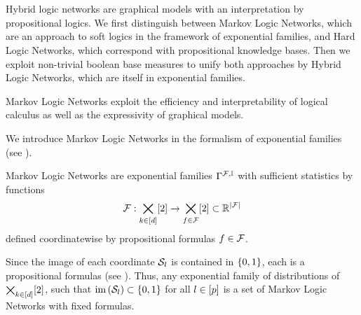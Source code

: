 \chapter{\chatextnetworkRepresentation}\label{cha:networkRepresentation}

Hybrid logic networks are graphical models with an interpretation by propositional logics.
We first distinguish between Markov Logic Networks, which are an approach to soft logics in the framework of exponential families, and Hard Logic Networks, which correspond with propositional knowledge bases.
Then we exploit non-trivial boolean base measures to unify both approaches by Hybrid Logic Networks, which are itself in exponential families.




Markov Logic Networks exploit the efficiency and interpretability of logical calculus as well as the expressivity of graphical models.


We introduce Markov Logic Networks in the formalism of exponential families (see ).

\begin{definition}
    Markov Logic Networks are exponential families $\Gamma^{\mathcal{F},\mathbb{I}}$ with sufficient statistics by functions
    \[ \mathcal{F} : \bigtimes_{k\in[d]}[2] \rightarrow \bigtimes_{f\in\mathcal{F}}[2] \subset \mathbb{R}^{\left|\mathcal{F}\right|} \]
    defined coordinatewise by propositional formulas $f\in\mathcal{F}$.
\end{definition}

Since the image of each coordinate $\mathcal{S}_{l}$ is contained in $\{0,1\}$, each is a propositional formulas (see ).
Thus, any exponential family of distributions of $\bigtimes_{k\in[d]}[2]$, such that $\mathrm{im}\left(\mathcal{S}_{l}\right)\subset\{0,1\}$ for all $l\in[p]$ is a set of Markov Logic Networks with fixed formulas.

